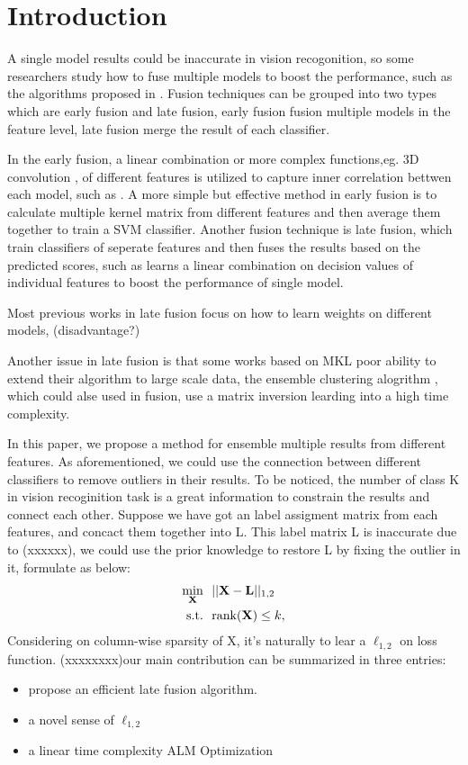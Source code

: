 \documentclass[letterpaper]{article}
\def\bL{{\bf L}}
\def\bX{{\bf X}}
\def\bX{{\bf X}}
\def\st{{\text{s.t.}}}
\def\rank{{\text{rank}}}
\begin{document}
\section{Introduction}

A single model results could be inaccurate in vision recogonition, so some researchers study how to fuse multiple models to boost the performance, such as the algorithms proposed in \cite{gehler2009feature,xuiccv2013feature,Rakotomamonjy2008Simplemkl}. Fusion techniques can be grouped into two types which are early fusion and late fusion, early fusion fusion multiple models in the feature level, late fusion merge the result of each classifier.

In the early fusion, a linear combination or more complex functions,eg. 3D convolution , of different features is utilized to capture inner correlation bettwen each model, such as \cite{Feichtenhofer2016Convolutional}. A more simple but effective method in early fusion is to calculate multiple kernel matrix from different features and then average them together to train a SVM classifier.
Another fusion technique is late fusion, which train classifiers of seperate features and then fuses the results based on the predicted scores, such as \cite{gehler2009feature} learns a linear combination on decision values of individual features to boost the performance of single model.

Most previous works in late fusion focus on how to learn weights on different models, (disadvantage?)

Another issue in late fusion is that some works based on MKL \cite{xuiccv2013feature} poor ability to extend their algorithm to large scale data, the ensemble clustering alogrithm \cite{gaoijcai2016robust}, which could alse used in fusion, use a matrix inversion learding into a high time complexity.

In this paper, we propose a method for ensemble multiple results from different features. As aforementioned, we could use the connection between different classifiers to remove outliers in their results. To be noticed, the number of class K in vision recoginition task is a great information to constrain the results and connect each other. Suppose we have got an label assigment matrix from each features, and concact them together into L. This label matrix L is inaccurate due to (xxxxxx), we could use the prior knowledge to restore L by fixing the outlier in it, formulate as below:
\begin{align}\label{eq:typical_mc}
  \min_{\bX} ~&~ || \bX - \bL ||_{1,2}   \nonumber \\
  \st        ~&~ \rank(\bX) \leq k  ,
\end{align}
\noindent
Considering on column-wise sparsity of X, it's naturally to lear a $\ell_{1,2}$ on loss function.
(xxxxxxxx)our main contribution can be summarized in three entries:
\begin{itemize}
  \item propose an efficient late fusion algorithm.
  \item a novel sense of $\ell_{1,2}$
  \item a linear time complexity ALM Optimization
\end{itemize}
\end{document}
